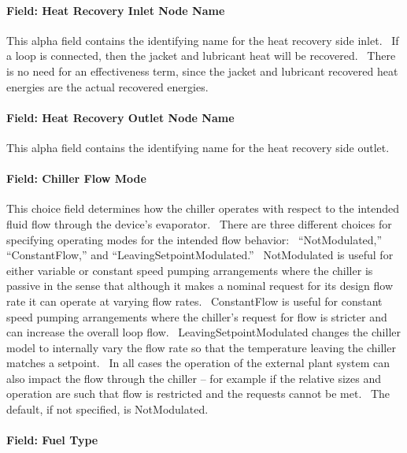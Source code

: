 \paragraph{Field: Heat Recovery Inlet Node Name}\label{field-heat-recovery-inlet-node-name-4}

This alpha field contains the identifying name for the heat recovery side inlet.~ If a loop is connected, then the jacket and lubricant heat will be recovered.~ There is no need for an effectiveness term, since the jacket and lubricant recovered heat energies are the actual recovered energies.

\paragraph{Field: Heat Recovery Outlet Node Name}\label{field-heat-recovery-outlet-node-name-4}

This alpha field contains the identifying name for the heat recovery side outlet.

\paragraph{Field: Chiller Flow Mode}\label{field-chiller-flow-mode-6}

This choice field determines how the chiller operates with respect to the intended fluid flow through the device's evaporator.~ There are three different choices for specifying operating modes for the intended flow behavior:~ ``NotModulated,'' ``ConstantFlow,'' and ``LeavingSetpointModulated.''~ NotModulated is useful for either variable or constant speed pumping arrangements where the chiller is passive in the sense that although it makes a nominal request for its design flow rate it can operate at varying flow rates.~ ConstantFlow is useful for constant speed pumping arrangements where the chiller's request for flow is stricter and can increase the overall loop flow.~ LeavingSetpointModulated changes the chiller model to internally vary the flow rate so that the temperature leaving the chiller matches a setpoint.~ In all cases the operation of the external plant system can also impact the flow through the chiller -- for example if the relative sizes and operation are such that flow is restricted and the requests cannot be met.~ The default, if not specified, is NotModulated.

\paragraph{Field: Fuel Type}\label{field-fuel-type-1-002}


